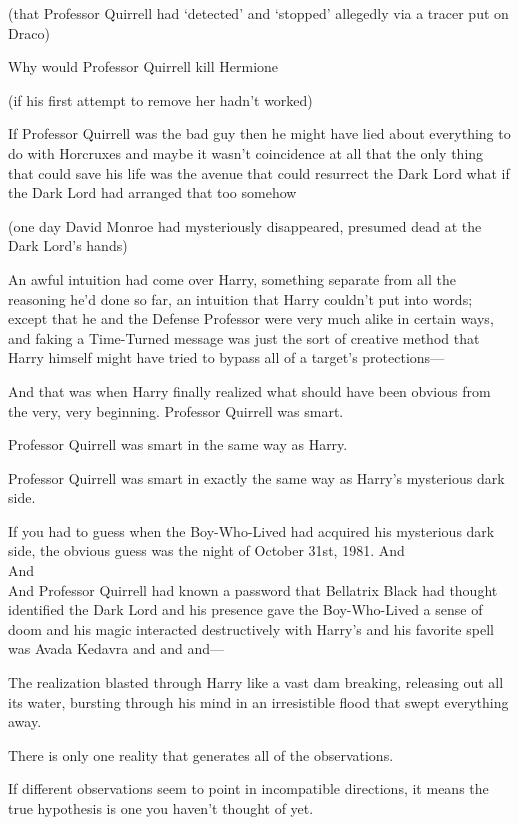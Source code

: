 (that Professor Quirrell had `detected' and `stopped' allegedly via a tracer
put on Draco)

Why would Professor Quirrell kill Hermione

(if his first attempt to remove her hadn't worked)

If Professor Quirrell was the bad guy then he might have lied about everything
to do with Horcruxes and maybe it wasn't coincidence at all that the only thing
that could save his life was the avenue that could resurrect the Dark Lord what
if the Dark Lord had arranged that too somehow

(one day David Monroe had mysteriously disappeared, presumed dead at the Dark
Lord's hands)

An awful intuition had come over Harry, something separate from all the
reasoning he'd done so far, an intuition that Harry couldn't put into words;
except that he and the Defense Professor were very much alike in certain ways,
and faking a Time-Turned message was just the sort of creative method that
Harry himself might have tried to bypass all of a target's protections—

And that was when Harry finally realized what should have been obvious from the
very, very beginning.
\sbreak
Professor Quirrell was smart.

Professor Quirrell was smart in the same way as Harry.

Professor Quirrell was smart in exactly the same way as Harry's mysterious dark
side.

If you had to guess when the Boy-Who-Lived had acquired his mysterious dark
side, the obvious guess was the night of October 31st, 1981.
\sbreak
And\\
And\\
And Professor Quirrell had known a password that Bellatrix Black had thought
identified the Dark Lord and his presence gave the Boy-Who-Lived a sense of
doom and his magic interacted destructively with Harry's and his favorite spell
was Avada Kedavra and and and—

The realization blasted through Harry like a vast dam breaking, releasing out
all its water, bursting through his mind in an irresistible flood that swept
everything away.

There is only one reality that generates all of the observations.

If different observations seem to point in incompatible directions, it means
the true hypothesis is one you haven't thought of yet.

